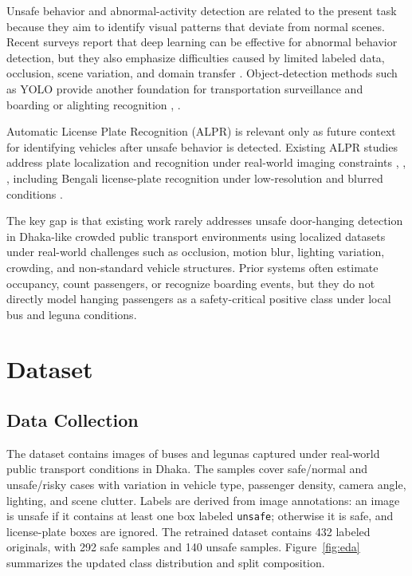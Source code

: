 \documentclass[conference]{IEEEtran}
\begin{document}
Unsafe behavior and abnormal-activity detection are related to the present task because they aim to identify visual patterns that deviate from normal scenes. Recent surveys report that deep learning can be effective for abnormal behavior detection, but they also emphasize difficulties caused by limited labeled data, occlusion, scene variation, and domain transfer \cite{wastupranata2024abnormal}. Object-detection methods such as YOLO provide another foundation for transportation surveillance and boarding or alighting recognition \cite{redmon2016yolo}, \cite{yolo2024boarding}.

Automatic License Plate Recognition (ALPR) is relevant only as future context for identifying vehicles after unsafe behavior is detected. Existing ALPR studies address plate localization and recognition under real-world imaging constraints \cite{anagnostopoulos2008license}, \cite{silva2018license}, \cite{du2013automatic}, including Bengali license-plate recognition under low-resolution and blurred conditions \cite{afrin2023bengali}.

The key gap is that existing work rarely addresses unsafe door-hanging detection in Dhaka-like crowded public transport environments using localized datasets under real-world challenges such as occlusion, motion blur, lighting variation, crowding, and non-standard vehicle structures. Prior systems often estimate occupancy, count passengers, or recognize boarding events, but they do not directly model hanging passengers as a safety-critical positive class under local bus and leguna conditions.

\section{Dataset}
\subsection{Data Collection}
The dataset contains images of buses and legunas captured under real-world public transport conditions in Dhaka. The samples cover safe/normal and unsafe/risky cases with variation in vehicle type, passenger density, camera angle, lighting, and scene clutter. Labels are derived from image annotations: an image is unsafe if it contains at least one box labeled \texttt{unsafe}; otherwise it is safe, and license-plate boxes are ignored. The retrained dataset contains 432 labeled originals, with 292 safe samples and 140 unsafe samples. Figure~\ref{fig:eda} summarizes the updated class distribution and split composition.
\end{document}
